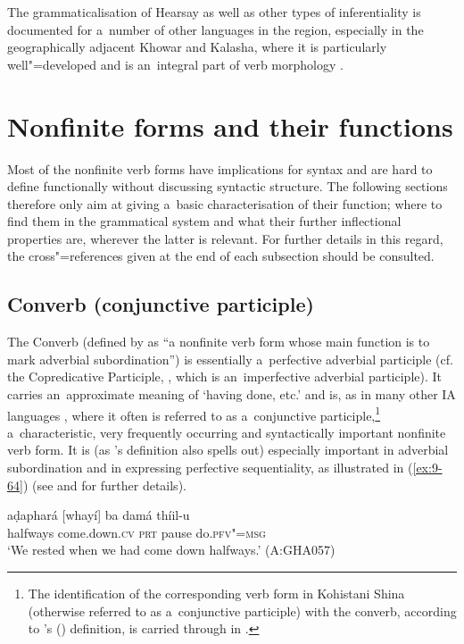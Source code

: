The grammaticalisation of Hearsay as well as other types of inferentiality is documented for a~number of other languages in the region, especially in the geographically adjacent Khowar and Kalasha, where it is particularly well"=developed and is an~integral part of verb morphology \citep{bashir1996}. 


\section{Nonfinite forms and their functions}
\label{sec:9-3}

Most of the nonfinite verb forms have implications for syntax and are hard to define functionally without discussing syntactic structure. The following sections therefore only aim at giving a~basic characterisation of their function; where to find them in the grammatical system and what their further inflectional properties are, wherever the latter is relevant. For further details in this regard, the cross"=references given at the end of each subsection should be consulted. 


\subsection{Converb (conjunctive participle) }
\label{subsec:9-3-1}


The Converb (defined by \citet{haspelmath1995} as ``a nonfinite verb form whose main function is to mark adverbial subordination'') is essentially a~perfective adverbial participle (cf. the Copredicative Participle, , which is an~imperfective adverbial participle). It carries an~approximate meaning of `having done, etc.' and is, as in many other IA languages \citep[323, 397--401]{masica1991}, where it often is referred to as a~conjunctive participle,\footnote{The identification of the corresponding verb form in Kohistani Shina (otherwise referred to as a~conjunctive participle) with the converb, according to \citeauthor{haspelmath1995}'s (\citeyear{haspelmath1995}) definition, is carried through in \citet{schmidt2003}.} a~characteristic, very frequently occurring and syntactically important nonfinite verb form. It is (as \citeauthor{haspelmath1995}'s definition also spells out) especially important in adverbial subordination and in expressing perfective sequentiality, as illustrated in (\ref{ex:9-64}) (see  and  for further details).

\begin{exe}
\ex
\label{ex:9-64}
\gll aḍaphará [whayí] ba damá thíil-u \\
halfways come.down.\textsc{cv} \textsc{prt} pause do.\textsc{pfv"=msg} \\
\glt `We rested when we had come down halfways.' (A:GHA057)
\end{exe}

